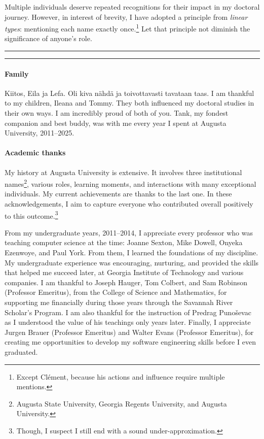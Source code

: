 Multiple individuals deserve repeated recognitions for their impact in my doctoral journey.
However, in interest of brevity, I have adopted a principle from \emph{linear types}: mentioning each name exactly once.\footnote{Except Clément, because his actions and influence require multiple mentions.}
Let that principle not diminish the significance of anyone's role. %

\noindent\hfil\rule{0.25\textwidth}{.4pt}\hspace{1em}\raisebox{-0.5\height}{\FiveFlowerOpen}\hspace{1em}\rule{0.25\textwidth}{.4pt}\hfil

\paragraph*{Family}
Kiitos, Eila ja Lefa.
Oli kiva nähdä ja toivottavasti tavataan taas.
I am thankful to my children, Ileana and Tommy.
They both influenced my doctoral studies in their own ways.
I am incredibly proud of both of you.
Tank, my fondest companion and best buddy, was with me every year I spent at Augusta University, 2011--2025.

\paragraph*{Academic thanks}
My history at {Augusta University} is extensive.
It involves three institutional names\footnote{Augusta State University, Georgia Regents University, and Augusta University.},
various roles, learning moments, and interactions with many exceptional individuals.
My current achievements are thanks to the last one.
In these acknowledgements, I aim to capture everyone who contributed overall positively to this outcome.\footnote{Though, I suspect I still end with a sound under-approximation.}

From my undergraduate years, 2011--2014, I appreciate every professor who was teaching computer science at the time: Joanne Sexton, Mike Dowell, Onyeka Ezenwoye, and Paul York.
From them, I learned the foundations of my discipline.
My undergraduate experience was encouraging, nurturing, and provided the skills that helped me succeed later, at Georgia Institute of Technology and various companies.
I am thankful to Joseph Hauger, Tom Colbert, and Sam Robinson (Professor Emeritus), from the College of Science and Mathematics, for supporting me financially during those years through the Savannah River Scholar's Program.
I am also thankful for the instruction of Predrag Punoševac as I understood the value of his teachings only years later.
Finally, I appreciate Jurgen Brauer (Professor Emeritus) and Walter Evans (Professor Emeritus),
for creating me opportunities to develop my software engineering skills before I even graduated.

